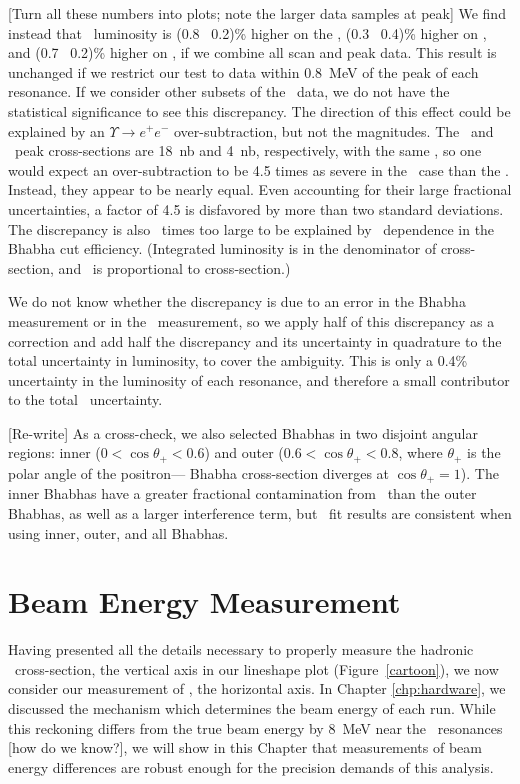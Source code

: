 \documentclass{cornell}
\begin{document}
\label{sec:luminosityconsistency}
[Turn all these numbers into plots; note the larger data samples at
peak] We find instead that \gamgam\ luminosity is (0.8 \PM\ 0.2)\%
higher on the \us, (0.3 \PM\ 0.4)\% higher on \uss, and (0.7 \PM\
0.2)\% higher on \usss, if we combine all scan and peak data.  This
result is unchanged if we restrict our test to data within 0.8~MeV of
the peak of each resonance.  If we consider other subsets of the \ups\
data, we do not have the statistical significance to see this
discrepancy.  The direction of this effect could be explained by an
$\Upsilon \to e^+e^-$ over-subtraction, but not the magnitudes.  The
\us\ and \usss\ peak cross-sections are 18~nb and 4~nb, respectively,
with the same \bee, so one would expect an over-subtraction to be 4.5
times as severe in the \us\ case than the \usss.  Instead, they appear
to be nearly equal.  Even accounting for their large fractional
uncertainties, a factor of 4.5 is disfavored by more than two standard
deviations.  The discrepancy is also \bork\ times too large to be
explained by \ecm\ dependence in the Bhabha cut efficiency.
(Integrated luminosity is in the denominator of cross-section, and
\geehadtot\ is proportional to cross-section.)

We do not know whether the discrepancy is due to an error in the
Bhabha measurement or in the \gamgam\ measurement, so we apply half of
this discrepancy as a correction and add half the discrepancy and its
uncertainty in quadrature to the total uncertainty in luminosity, to
cover the ambiguity.  This is only a 0.4\% uncertainty in the
luminosity of each resonance, and therefore a small contributor to the
total \gee\ uncertainty.

[Re-write] As a cross-check, we also selected Bhabhas in two disjoint
angular regions: inner ($0 < \cos\theta_+ < 0.6$) and outer ($0.6 <
\cos\theta_+ < 0.8$, where $\theta_+$ is the polar angle of the
positron--- Bhabha cross-section diverges at $\cos\theta_+ = 1$).  The
inner Bhabhas have a greater fractional contamination from \ups\ than
the outer Bhabhas, as well as a larger interference term, but \ups\
fit results are consistent when using inner, outer, and all Bhabhas.

\chapter{Beam Energy Measurement}
\label{chp:beamenergy}

Having presented all the details necessary to properly measure the
hadronic \ups\ cross-section, the vertical axis in our lineshape plot
(Figure~\ref{cartoon}), we now consider our measurement of \ecm, the
horizontal axis.  In Chapter \ref{chp:hardware}, we discussed the
mechanism which determines the beam energy of each run.  While this
reckoning differs from the true beam energy by 8~MeV near the \ups\
resonances [how do we know?], we will show in this Chapter that measurements of beam
energy differences are robust enough for the precision demands of this
analysis.
\end{document}
